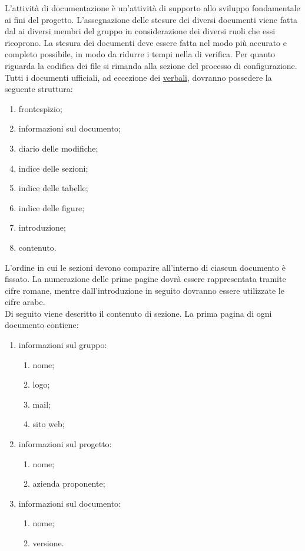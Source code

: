 	L'attività di documentazione è un'attività di supporto allo sviluppo fondamentale ai fini del progetto.
	L'assegnazione delle stesure dei diversi documenti viene fatta dal  ai diversi membri del gruppo in considerazione dei diversi ruoli che essi ricoprono.
	La stesura dei documenti deve essere fatta nel modo più accurato e completo possibile, in modo da ridurre i tempi nella  di verifica.
				Per quanto riguarda la codifica dei file si rimanda alla sezione  del processo di configurazione.
				Tutti i documenti ufficiali, ad eccezione dei \hyperref[sec:verbali]{verbali}, dovranno possedere la seguente struttura:
				\begin{enumerate}
					\item frontespizio;
					\item informazioni sul documento;
					\item diario delle modifiche;
					\item indice delle sezioni;
					\item indice delle tabelle;
					\item indice delle figure;
					\item introduzione;
					\item contenuto.
				\end{enumerate}
				L’ordine in cui le sezioni devono comparire all’interno di ciascun documento è fissato. La numerazione delle prime pagine dovrà essere rappresentata tramite cifre romane, mentre dall'introduzione in seguito dovranno essere utilizzate le cifre arabe. \\
				Di seguito viene descritto il contenuto di sezione.
					La prima pagina di ogni documento contiene:
					\begin{enumerate}
						\item informazioni sul gruppo:
						\begin{enumerate}
							\item nome;
							\item logo;
							\item mail;
							\item sito web;
						\end{enumerate}
						\item informazioni sul progetto:
						\begin{enumerate}
							\item nome;
							\item azienda proponente;
						\end{enumerate}
						\item informazioni sul documento:
						\begin{enumerate}
							\item nome;
							\item versione.
						\end{enumerate}
					\end{enumerate}
